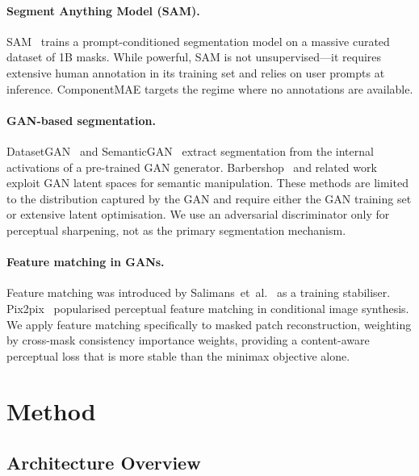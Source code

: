 \documentclass{article}
\begin{document}
\paragraph{Segment Anything Model (SAM).}
SAM~\cite{kirillov2023segment} trains a prompt-conditioned segmentation model on
a massive curated dataset of 1B masks.  While powerful, SAM is not unsupervised---it
requires extensive human annotation in its training set and relies on user prompts
at inference.  ComponentMAE targets the regime where no annotations are available.

\paragraph{GAN-based segmentation.}
DatasetGAN~\cite{zhang2021datasetgan} and SemanticGAN~\cite{li2021semantic} extract
segmentation from the internal activations of a pre-trained GAN generator.
Barbershop~\cite{zhu2021barbershop} and related work exploit GAN latent spaces for
semantic manipulation.  These methods are limited to the distribution captured by
the GAN and require either the GAN training set or extensive latent optimisation.
We use an adversarial discriminator only for perceptual sharpening, not as the
primary segmentation mechanism.

\paragraph{Feature matching in GANs.}
Feature matching was introduced by Salimans~et~al.~\cite{salimans2016improved} as
a training stabiliser.  Pix2pix~\cite{isola2017image} popularised perceptual feature
matching in conditional image synthesis.  We apply feature matching specifically to
masked patch reconstruction, weighting by cross-mask consistency importance weights,
providing a content-aware perceptual loss that is more stable than the minimax
objective alone.

\section{Method}
\label{sec:method}

\subsection{Architecture Overview}
\label{sec:arch}
\end{document}
